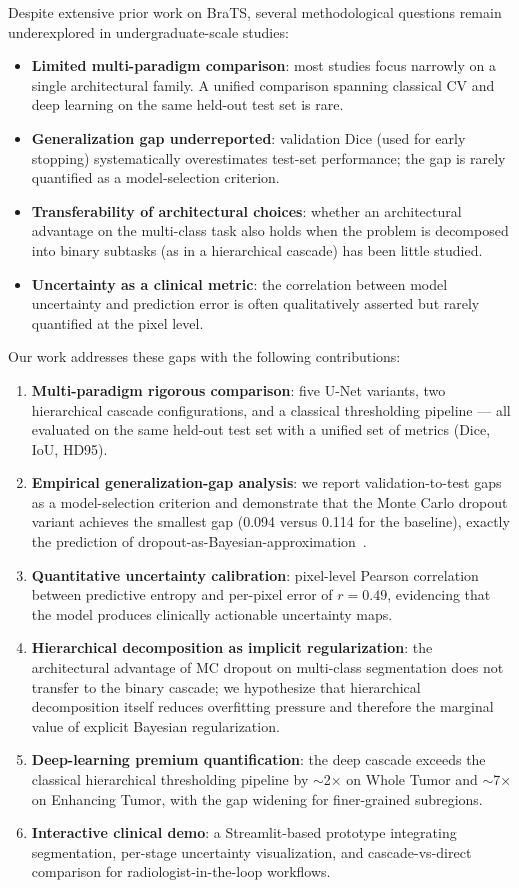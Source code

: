 \documentclass[conference]{IEEEtran}
\begin{document}
Despite extensive prior work on BraTS, several methodological questions
remain underexplored in undergraduate-scale studies:

\begin{itemize}
\item \textbf{Limited multi-paradigm comparison}: most studies focus
narrowly on a single architectural family. A unified comparison spanning
classical CV and deep learning on the same held-out test set is rare.
\item \textbf{Generalization gap underreported}: validation Dice (used
for early stopping) systematically overestimates test-set performance;
the gap is rarely quantified as a model-selection criterion.
\item \textbf{Transferability of architectural choices}: whether an
architectural advantage on the multi-class task also holds when the
problem is decomposed into binary subtasks (as in a hierarchical cascade)
has been little studied.
\item \textbf{Uncertainty as a clinical metric}: the correlation between
model uncertainty and prediction error is often qualitatively asserted
but rarely quantified at the pixel level.
\end{itemize}

Our work addresses these gaps with the following contributions:

\begin{enumerate}
\item \textbf{Multi-paradigm rigorous comparison}: five U-Net variants,
two hierarchical cascade configurations, and a classical thresholding
pipeline --- all evaluated on the same held-out test set with a unified
set of metrics (Dice, IoU, HD95).
\item \textbf{Empirical generalization-gap analysis}: we report
validation-to-test gaps as a model-selection criterion and demonstrate
that the Monte Carlo dropout variant achieves the smallest gap (0.094
versus 0.114 for the baseline), exactly the prediction of
dropout-as-Bayesian-approximation~\cite{gal2016dropout}.
\item \textbf{Quantitative uncertainty calibration}: pixel-level Pearson
correlation between predictive entropy and per-pixel error of $r=0.49$,
evidencing that the model produces clinically actionable uncertainty
maps.
\item \textbf{Hierarchical decomposition as implicit regularization}:
the architectural advantage of MC dropout on multi-class segmentation
does not transfer to the binary cascade; we hypothesize that
hierarchical decomposition itself reduces overfitting pressure and
therefore the marginal value of explicit Bayesian regularization.
\item \textbf{Deep-learning premium quantification}: the deep cascade
exceeds the classical hierarchical thresholding pipeline by
$\sim$2$\times$ on Whole Tumor and $\sim$7$\times$ on Enhancing Tumor,
with the gap widening for finer-grained subregions.
\item \textbf{Interactive clinical demo}: a Streamlit-based prototype
integrating segmentation, per-stage uncertainty visualization, and
cascade-vs-direct comparison for radiologist-in-the-loop workflows.
\end{enumerate}
\end{document}
